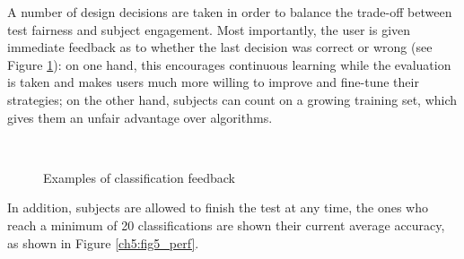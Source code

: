 A number of design decisions are taken in order to balance the trade-off between test fairness and subject engagement. Most importantly, the user is given
immediate feedback as to whether the last decision was correct or wrong (see Figure \ref{ch5:fig4_fb}): on one hand, this encourages continuous learning while the evaluation is taken and
makes users much more willing to improve and fine-tune their strategies; on the other hand, subjects can count on a growing training set, which gives them an
unfair advantage over algorithms.

\begin{figure}[!hbt]
  \centering
    \\
    \caption{Examples of classification feedback}
    \label{ch5:fig4_fb}
\end{figure}


In addition, subjects are allowed to finish the test at any time, the ones who reach a minimum of 20 classifications are shown their
current average accuracy, as shown in Figure \ref{ch5:fig5_perf}.

